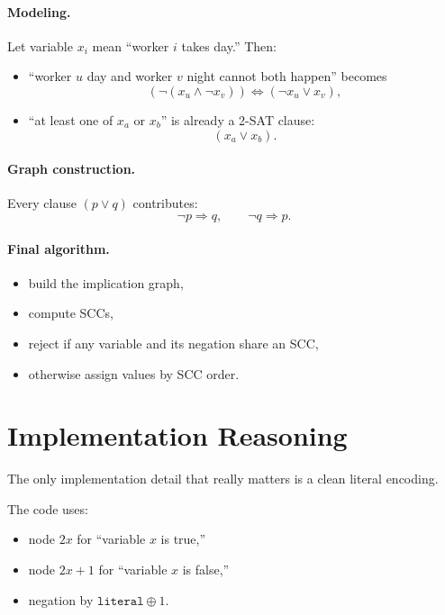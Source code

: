\paragraph{Modeling.}
Let variable \(x_i\) mean ``worker \(i\) takes day.'' Then:

\begin{itemize}
  \item ``worker \(u\) day and worker \(v\) night cannot both happen'' becomes
  \[
  (\lnot(x_u \land \lnot x_v)) \iff (\lnot x_u \lor x_v),
  \]
  \item ``at least one of \(x_a\) or \(x_b\)'' is already a 2-SAT clause:
  \[
  (x_a \lor x_b).
  \]
\end{itemize}

\paragraph{Graph construction.}
Every clause \((p \lor q)\) contributes:
\[
\lnot p \Rightarrow q,\qquad
\lnot q \Rightarrow p.
\]

\paragraph{Final algorithm.}

\begin{itemize}
  \item build the implication graph,
  \item compute SCCs,
  \item reject if any variable and its negation share an SCC,
  \item otherwise assign values by SCC order.
\end{itemize}

\section*{Implementation Reasoning}

The only implementation detail that really matters is a clean literal encoding.

The code uses:

\begin{itemize}
  \item node \(2x\) for ``variable \(x\) is true,''
  \item node \(2x+1\) for ``variable \(x\) is false,''
  \item negation by \(\texttt{literal} \oplus 1\).
\end{itemize}

